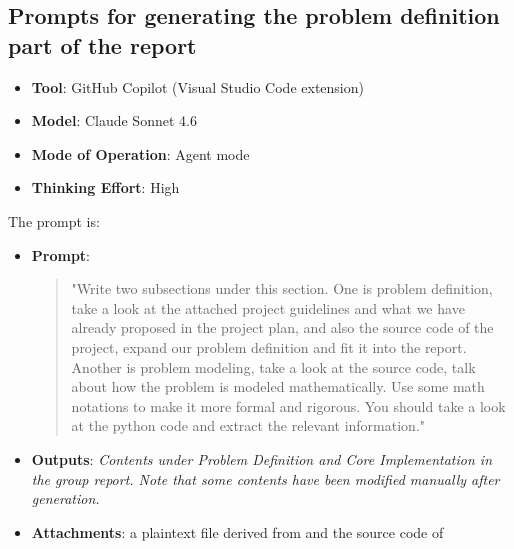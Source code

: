 \documentclass[a4paper,10pt]{amsart}
\begin{document}
\subsection{Prompts for generating the problem definition part of the report}
\begin{itemize}
    \item \textbf{Tool}: GitHub Copilot (Visual Studio Code extension)
    \item \textbf{Model}: Claude Sonnet 4.6
    \item \textbf{Mode of Operation}: Agent mode
    \item \textbf{Thinking Effort}: High
\end{itemize}

The prompt is:
\begin{itemize}
    \item \textbf{Prompt}:
    \begin{quotation}
        \ttfamily "Write two subsections under this section.
        One is problem definition, take a look at the attached project guidelines and what we have already proposed in the project plan, and also the source code of the project, expand our problem definition and fit it into the report.
        Another is problem modeling, take a look at the source code, talk about how the problem is modeled mathematically.
        Use some math notations to make it more formal and rigorous.
        You should take a look at the python code and extract the relevant information."
    \end{quotation}
    \item \textbf{Outputs}: \textit{Contents under Problem Definition and Core Implementation in the group report. Note that some contents have been modified manually after generation.}
    \item \textbf{Attachments}: a plaintext file derived from  and the source code of 
\end{itemize}
\end{document}
